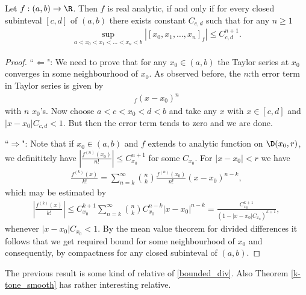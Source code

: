 \begin{lause}\label{div_anal}
	Let $f : (a, b) \to \R$. Then $f$ is real analytic, if and only if for every closed subinteval $[c, d]$ of $(a, b)$ there exists constant $C_{c, d}$ such that for any $n \geq 1$
	\begin{align*}
		\sup_{a < x_{0} < x_{1} < \ldots < x_{n}< b} |[x_{0}, x_{1}, \ldots, x_{n}]_{f}| \leq C_{c, d}^{n + 1}.
	\end{align*}
\end{lause}
\begin{proof}
	``$\Leftarrow$": We need to prove that for any $x_{0} \in (a, b)$ the Taylor series at $x_{0}$ converges in some neighbourhood of $x_{0}$. As observed before, the $n$:th error term in Taylor series is given by
	\begin{align*}
		[x, x_{0}, x_{0}, \ldots, x_{0}]_{f} (x - x_{0})^{n}
	\end{align*}
	with $n$ $x_{0}$'s. Now choose $a < c < x_{0} < d < b$ and take any $x$ with $x \in [c, d]$ and $|x - x_{0}| C_{c, d} < 1$. But then the error term tends to zero and we are done.

	``$\Rightarrow$": Note that if $x_{0} \in (a, b)$ and $f$ extends to analytic function on $\D(x_{0}, r)$, we definititely have $\left|\frac{f^{(n)}(x_{0})}{n!}\right| \leq C_{x_{0}}^{n + 1}$ for some $C_{x_{0}}$. For $|x - x_{0}| < r$ we have
	\begin{align*}
		\frac{f^{(k)}(x)}{k!} = \sum_{n = k}^{\infty} \binom{n}{k} \frac{f^{(n)}(x_{0})}{n!} (x - x_{0})^{n - k},
	\end{align*}
	which may be estimated by
	\begin{align*}
	 \left|\frac{f^{(k)}(x)}{k!}\right| \leq C_{x_{0}}^{k + 1}\sum_{n = k}^{\infty} \binom{n}{k} C_{x_{0}}^{n - k} |x - x_{0}|^{n - k} = \frac{C_{x_{0}}^{k + 1} }{(1 - |x - x_{0}| C_{x_{0}})^{k + 1}},
	\end{align*}
	whenever $|x - x_{0}| C_{x_{0}} < 1$. By the mean value theorem for divided differences it follows that we get required bound for some neighbourhood of $x_{0}$ and consequently, by compactness for any closed subinteval of $(a, b)$.
\end{proof}

The previous result is some kind of relative of \ref{bounded_div}. Also Theorem \ref{k-tone_smooth} has rather interesting relative.

